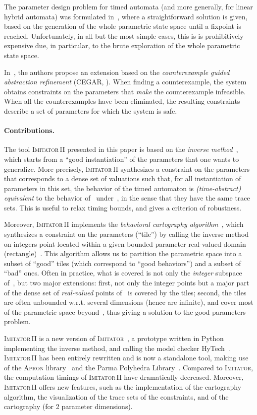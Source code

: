 \documentclass[submission,copyright,creativecommons]{eptcs}
\newcommand{\apron}{\textsc{Apron}}
\newcommand{\hytech}{{\sc HyTech}}
\newcommand{\imitator}{\textsc{Imitator}}
\newcommand{\imitatordeux}{\textsc{Imitator}\,II}
\newcommand{\python}{Python}
\newcommand{\paragraphe}[1]{\paragraph{#1.}}
\begin{document}
The parameter design problem for timed automata (and more generally, for linear hybrid automata)
was formulated in~\cite{hw96}, where a straightforward solution is given,
based on the generation of the whole parametric state space until a fixpoint is reached.
Unfortunately, in all but the most simple cases, this is is prohibitively expensive due, in particular, to the brute exploration of the whole parametric state space.

In~\cite{fjk08}, the authors propose an extension based on the {\em counterexample guided abstraction refinement} (CEGAR, \cite{cgjlv00}).
When finding a counterexample, the system obtains constraints on the parameters that {\em make} the counterexample infeasible.
When all the counterexamples have been eliminated, the resulting constraints describe a set of parameters for which the system is safe.



\paragraphe{Contributions}
The tool \imitatordeux{} presented in this paper is based on the {\em inverse method}~\cite{acef09}, which starts from a ``good instantiation''  of the parameters that one wants to generalize.
More precisely, \imitatordeux{} synthesizes a constraint  on the parameters that corresponds to a dense set of valuations such that, for all instantiation  of parameters in this set, the behavior of the timed automaton  is {\em (time-abstract) equivalent} to the behavior of~ under~, in the sense that they have the same trace sets.
This is useful to relax timing bounds, and gives a criterion of robustness.

Moreover, \imitatordeux{} implements the \emph{behavioral cartography algorithm}~\cite{af10}, which synthesizes a constraint on the parameters (``tile'') by calling the inverse method on integers point located within a given bounded parameter real-valued domain (rectangle)~.
This algorithm allows us to partition the parametric space into a subset of ``good'' tiles (which correspond to ``good behaviors'') and a subset of ``bad'' ones.
Often in practice, what is covered is not only the {\em integer} subspace of~, but two major extensions:
first, not only the integer points but a major part of the dense set of {\em real-valued} points of~ is covered by the tiles;
second, the tiles are often unbounded w.r.t. several dimensions (hence are infinite), and cover most of the parametric space beyond~, thus giving a solution to the good parameters problem.

\imitatordeux{} is a new version of \imitator{}~\cite{and09}, a prototype written in \python{}~\cite{python-web} implementing the inverse method, and calling the model checker \hytech{}~\cite{hhw97}.
\imitatordeux{} has been entirely rewritten and is now a standalone tool, making use of the \apron{} library~\cite{jm09} and the Parma Polyhedra Library~\cite{bhz08}.
Compared to \imitator{}, the computation timings of \imitatordeux{} have dramatically decreased.
Moreover, \imitatordeux{} offers new features, such as the implementation of the cartography algorithm, the visualization of the trace sets of the constraints, and of the cartography (for 2 parameter dimensions).
\end{document}

